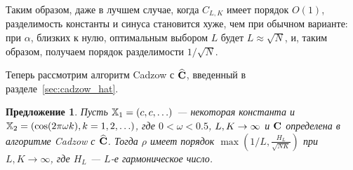 \documentclass[12pt,a4paper,fleqn,leqno]{article}
\newtheorem{proposition}{Предложение}
\begin{document}
Таким образом, даже в лучшем случае, когда $C_{L,K}$ имеет порядок $O(1)$, разделимость константы и синуса становится хуже, чем при обычном варианте: при $\alpha$, близких к нулю, оптимальным выбором $L$ будет $L \approx \sqrt{N}$, и, таким образом, получаем порядок разделимости $1/\sqrt{N}$.

Теперь рассмотрим алгоритм Cadzow с $\widehat{\mathbf{C}}$, введенный в разделе~\ref{sec:cadzow_hat}.

\begin{proposition}
\label{prop:separ2}
Пусть $\mathbb{X}_1 = (c, c, \ldots)$ --- некоторая константа и $\mathbb{X}_2 = (\cos(2 \pi \omega k), k = 1, 2, \ldots)$, где $0<\omega <0.5$, $L,K\rightarrow \infty$ и $\mathbf{C}$ определена в алгоритме Cadzow с $\widehat{\mathbf{C}}$.
 Тогда $\rho$ имеет порядок $\max \left(1/L, \frac{H_L}{\sqrt{NK}} \right)$ при $L, K \to \infty$, где $H_L$ --- $L$-е гармоническое число.
\end{proposition}
\end{document}
